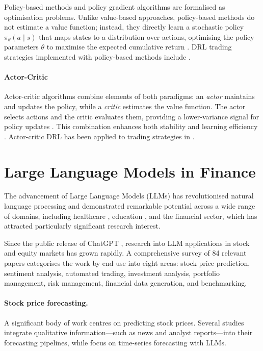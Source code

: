 \documentclass[12pt, a4paper]{report}
\begin{document}
Policy-based methods and policy gradient algorithms are formalised as
optimisation problems. Unlike value-based approaches, policy-based methods do not estimate a
value function; instead, they directly learn a stochastic policy $\pi_\theta(a \mid s)$ that
maps states to a distribution over actions, optimising the policy parameters $\theta$ to
maximise the expected cumulative return \cite{sutton1999pg}. DRL trading strategies
implemented with policy-based methods include
\cite{lele2020,liu2021policy,wang2021policy}.

\paragraph{Actor-Critic}
\label{sec:actor-critic}

Actor-critic algorithms combine elements of both paradigms: an \emph{actor} maintains and
updates the policy, while a \emph{critic} estimates the value function. The actor selects
actions and the critic evaluates them, providing a lower-variance signal for policy updates
\cite{xiong2018}. This combination enhances both stability and learning efficiency
\cite{yang2020}. Actor-critic DRL has been applied to trading strategies in
\cite{ge2022,lima2021,liu2020actorcritic}.

\section{Large Language Models in Finance}
\label{sec:llms}

The advancement of Large Language Models (LLMs) has revolutionised natural language
processing and demonstrated remarkable potential across a wide range of domains, including
healthcare \cite{mehandru2024evaluating}, education \cite{zhang2024simulating}, and the financial
sector, which has attracted particularly significant research interest.

Since the public release of ChatGPT \cite{achiam2023gpt4}, research into LLM applications in stock and equity
markets has grown rapidly. A comprehensive survey \cite{jadhav2025llmequity} of 84
relevant papers categorises the work by end use into eight areas: stock price prediction,
sentiment analysis, automated trading, investment analysis, portfolio management, risk
management, financial data generation, and benchmarking.

\paragraph{Stock price forecasting.}
A significant body of work centres on predicting stock prices. Several studies
\cite{ni2024,ding2023,guo2024hauptmann,lopezlira2023}
integrate qualitative information---such as news and analyst reports---into their forecasting
pipelines, while \cite{valeyre2024,wang2024ts,wang2024b} focus on
time-series forecasting with LLMs.
\end{document}
